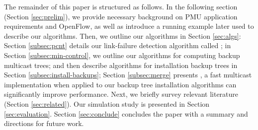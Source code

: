 The remainder of this paper is structured as follows.  In the following section (Section \ref{sec:prelim}), we provide necessary background on PMU application requirements and OpenFlow, as well
as introduce a running example later used to describe our algorithms.  
Then, we outline our algorithms in Section \ref{sec:algs}:
Section \ref{subsec:pcnt} details our link-failure detection algorithm called \pcnts; in Section \ref{subsec:min-control}, we outline our algorithms for computing backup multicast trees; and
then describe algorithms for installation backup trees in Section \ref{subsec:install-backups}; Section \ref{subsec:merge} presents \merges, a fast multicast implementation 
when applied to our backup tree installation algorithms can significantly improve performance.
Next, we briefly survey relevant literature (Section \ref{sec:related}).
Our simulation study is presented in Section \ref{sec:evaluation}. Section \ref{sec:conclude} concludes the paper with a summary and directions for future work.

